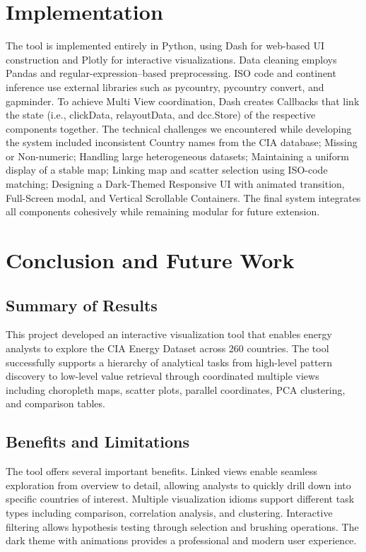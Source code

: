 \documentclass[conference]{IEEEtran}
\begin{document}
\section{Implementation}
The tool is implemented entirely in Python, using Dash for web-based UI construction and Plotly for interactive visualizations. Data cleaning employs Pandas and regular-expression–based preprocessing. ISO code and continent inference use external libraries such as pycountry, pycountry convert, and gapminder. To achieve Multi View coordination, Dash creates Callbacks that link the state (i.e., clickData, relayoutData, and dcc.Store) of the respective components together. The technical challenges we encountered while developing the system included inconsistent Country names from the CIA database; Missing or Non-numeric; Handling large heterogeneous datasets; Maintaining a uniform display of a stable map; Linking map and scatter selection using ISO-code matching; Designing a Dark-Themed Responsive UI with animated transition, Full-Screen modal, and Vertical Scrollable Containers. The final system integrates all components cohesively while remaining modular for future extension.

\section{Conclusion and Future Work}
\subsection{Summary of Results}
This project developed an interactive visualization tool that enables energy analysts to explore the CIA Energy Dataset across 260 countries. The tool successfully supports a hierarchy of analytical tasks from high-level pattern discovery to low-level value retrieval through coordinated multiple views including choropleth maps, scatter plots, parallel coordinates, PCA clustering, and comparison tables.

\subsection{Benefits and Limitations}
The tool offers several important benefits. Linked views enable seamless exploration from overview to detail, allowing analysts to quickly drill down into specific countries of interest. Multiple visualization idioms support different task types including comparison, correlation analysis, and clustering. Interactive filtering allows hypothesis testing through selection and brushing operations. The dark theme with animations provides a professional and modern user experience.
\end{document}
